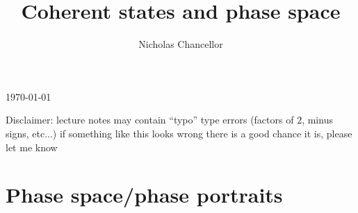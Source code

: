 \documentclass[english]{article}
\begin{document}
\title{Coherent states and phase space}
\author{Nicholas Chancellor}


\maketitle


\today %


{\small Disclaimer: lecture notes may contain ``typo'' type errors (factors of $2$, minus signs, etc...) if something like this looks wrong there is a good chance it is, please let me know}


\section{Phase space/phase portraits}
\end{document}

